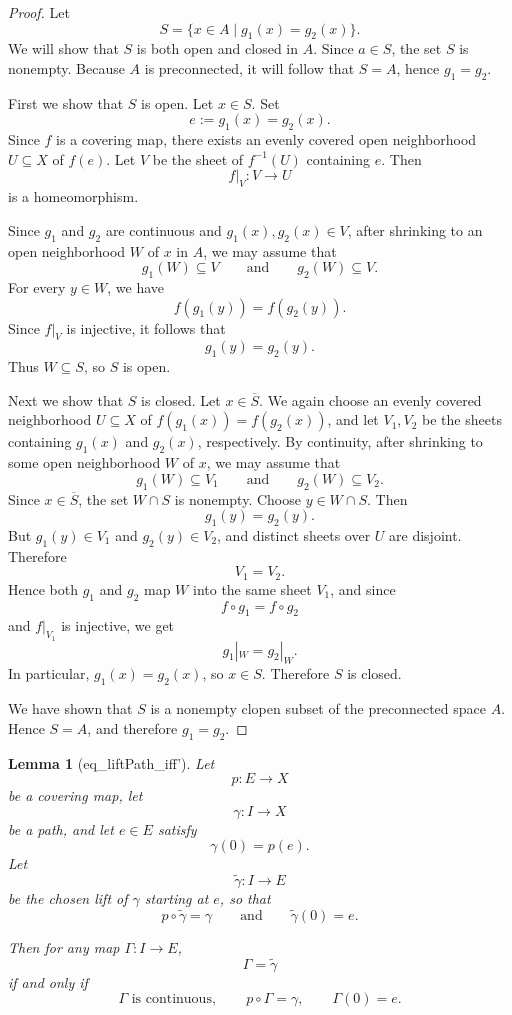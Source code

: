 \documentclass{article}
\newtheorem{lemma}{Lemma}
\begin{document}
\begin{proof}
Let
\[
S=\{x\in A \mid g_1(x)=g_2(x)\}.
\]
We will show that \(S\) is both open and closed in \(A\). Since \(a\in S\), the set \(S\) is nonempty. Because \(A\) is preconnected, it will follow that \(S=A\), hence \(g_1=g_2\).

First we show that \(S\) is open. Let \(x\in S\). Set
\[
e:=g_1(x)=g_2(x).
\]
Since \(f\) is a covering map, there exists an evenly covered open neighborhood \(U\subseteq X\) of \(f(e)\). Let \(V\) be the sheet of \(f^{-1}(U)\) containing \(e\). Then
\[
f|_V:V\to U
\]
is a homeomorphism.

Since \(g_1\) and \(g_2\) are continuous and \(g_1(x),g_2(x)\in V\), after shrinking to an open neighborhood \(W\) of \(x\) in \(A\), we may assume that
\[
g_1(W)\subseteq V
\qquad\text{and}\qquad
g_2(W)\subseteq V.
\]
For every \(y\in W\), we have
\[
f(g_1(y))=f(g_2(y)).
\]
Since \(f|_V\) is injective, it follows that
\[
g_1(y)=g_2(y).
\]
Thus \(W\subseteq S\), so \(S\) is open.

Next we show that \(S\) is closed. Let \(x\in \overline{S}\). We again choose an evenly covered neighborhood \(U\subseteq X\) of \(f(g_1(x))=f(g_2(x))\), and let \(V_1,V_2\) be the sheets containing \(g_1(x)\) and \(g_2(x)\), respectively. By continuity, after shrinking to some open neighborhood \(W\) of \(x\), we may assume that
\[
g_1(W)\subseteq V_1
\qquad\text{and}\qquad
g_2(W)\subseteq V_2.
\]
Since \(x\in \overline{S}\), the set \(W\cap S\) is nonempty. Choose \(y\in W\cap S\). Then
\[
g_1(y)=g_2(y).
\]
But \(g_1(y)\in V_1\) and \(g_2(y)\in V_2\), and distinct sheets over \(U\) are disjoint. Therefore
\[
V_1=V_2.
\]
Hence both \(g_1\) and \(g_2\) map \(W\) into the same sheet \(V_1\), and since
\[
f\circ g_1=f\circ g_2
\]
and \(f|_{V_1}\) is injective, we get
\[
g_1|_W=g_2|_W.
\]
In particular, \(g_1(x)=g_2(x)\), so \(x\in S\). Therefore \(S\) is closed.

We have shown that \(S\) is a nonempty clopen subset of the preconnected space \(A\). Hence \(S=A\), and therefore \(g_1=g_2\).
\end{proof}

\begin{lemma}[eq_liftPath_iff']
Let
\[
p:E\to X
\]
be a covering map, let
\[
\gamma:I\to X
\]
be a path, and let \(e\in E\) satisfy
\[
\gamma(0)=p(e).
\]
Let
\[
\widetilde{\gamma}:I\to E
\]
be the chosen lift of \(\gamma\) starting at \(e\), so that
\[
p\circ \widetilde{\gamma}=\gamma
\qquad\text{and}\qquad
\widetilde{\gamma}(0)=e.
\]

Then for any map \(\Gamma:I\to E\),
\[
\Gamma=\widetilde{\gamma}
\]
if and only if
\[
\Gamma \text{ is continuous},\qquad p\circ \Gamma=\gamma,\qquad \Gamma(0)=e.
\]
\end{lemma}
\end{document}
